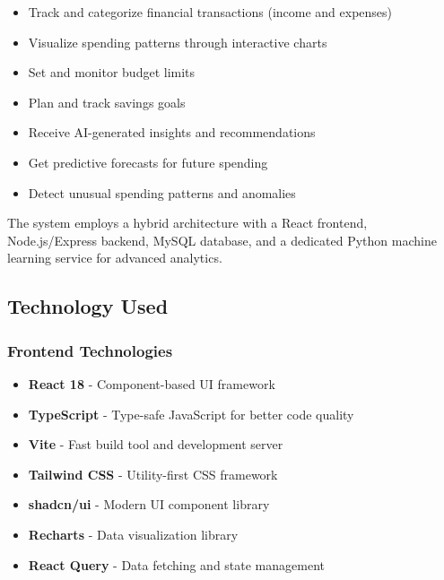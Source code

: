 \documentclass[12pt,a4paper]{article}
\begin{document}
\begin{itemize}
    \item Track and categorize financial transactions (income and expenses)
    \item Visualize spending patterns through interactive charts
    \item Set and monitor budget limits
    \item Plan and track savings goals
    \item Receive AI-generated insights and recommendations
    \item Get predictive forecasts for future spending
    \item Detect unusual spending patterns and anomalies
\end{itemize}

The system employs a hybrid architecture with a React frontend, Node.js/Express backend, MySQL database, and a dedicated Python machine learning service for advanced analytics.

\subsection{Technology Used}

\subsubsection{Frontend Technologies}
\begin{itemize}
    \item \textbf{React 18} - Component-based UI framework
    \item \textbf{TypeScript} - Type-safe JavaScript for better code quality
    \item \textbf{Vite} - Fast build tool and development server
    \item \textbf{Tailwind CSS} - Utility-first CSS framework
    \item \textbf{shadcn/ui} - Modern UI component library
    \item \textbf{Recharts} - Data visualization library
    \item \textbf{React Query} - Data fetching and state management
\end{itemize}
\end{document}
